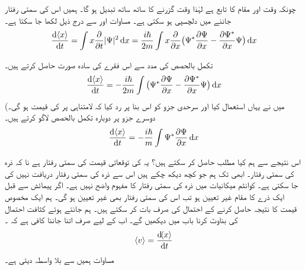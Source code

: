  چونکہ  وقت اور مقام کا تابع ہے لہٰذا وقت گزرنے کا ساتھ ساتھ  تبدیل ہو گا۔ ہمیں اس کی سمتی رفتار جاننے میں دلچسپی ہو سکتی ہے۔ مساوات   اور   سے درج ذیل  لکھا جا سکتا ہے۔
\begin{align}\label{مساوات_تفاعل_موج_رفتار_توقعاتی_الف}
\frac{\dif \,\langle x \rangle}{\dif{t}}=\int x\frac{\partial}{\partial{t}}|\Psi|^{2}\dif{x}=\frac{i\hslash}{2m}\int x\frac{\partial}{\partial{x}}\big (\Psi ^*\frac{\partial{\Psi}}{\partial{x}}-\frac{\partial{\Psi^ *}}{\partial{x}}\Psi \big)\dif{x}
\end{align}

تکمل بالحصص  کی مدد سے اس فقرے کی سادہ  صورت حاصل کرتے ہیں۔
\begin{align}
\frac{\dif\, \langle x \rangle}{\dif{t}}=-\frac{i\hslash}{2m}\int\big (\Psi^*\frac{\partial{\Psi}}{\partial{x}}-\frac{\partial{\Psi^*}}{\partial{x}}\Psi \big)\dif{x}
\end{align}
(میں نے یہاں  استعمال کیا اور سرحدی جزو کو اس بنا پر رد کیا کہ  لامتناہی پر  کی قیمت   ہو گی۔ دوسرے جزو پر  دوبارہ تکمل بالحصص لاگو کرتے ہیں۔
\begin{align}\label{مساوات_تفاعل_موج_توقعاتی_قیمت_رفتار}
\frac{\dif \,\langle x \rangle}{\dif{t}}=-\frac{i\hslash}{m}\int\Psi^*\frac{\partial{\Psi}}{\partial{x}} \dif{x}
\end{align}

اس نتیجے سے ہم کیا مطلب حاصل کر سکتے ہیں؟ یہ   کی توقعاتی قیمت کی سمتی رفتار ہے نا کہ  ذرہ کی سمتی رفتار۔  ابھی تک ہم جو کچھ دیکھ چکے ہیں اس سے ذرہ  کی سمتی رفتار دریافت نہیں کی جا سکتی ہے۔ کوانٹم میکانیات میں ذرہ  کی  سمتی رفتار کا مفہوم واضح  نہیں ہے۔ اگر پیمائش سے قبل ایک ذرے کا مقام  غیر تعیین  ہو تب اس کی سمتی رفتار بھی غیر تعیین ہو گی۔ ہم ایک مخصوص قیمت کا نتیجہ حاصل کرنے کے احتمال کی صرف بات کر سکتے ہیں۔ ہم  جانتے ہوئے کثافت احتمال کی بناوٹ کرنا باب  میں دیکھیں گے۔ اب کے لیے صرف اتنا جاننا کافی ہے کہ  ۔
\begin{align}\label{مساوات_تفاعل_موج_تعریف_رفتار}
\langle v \rangle=\frac{\dif\langle x \rangle}{\dif{t}}
\end{align}
مساوات  ہمیں  سے بلا واسطہ  دیتی ہے۔ 

